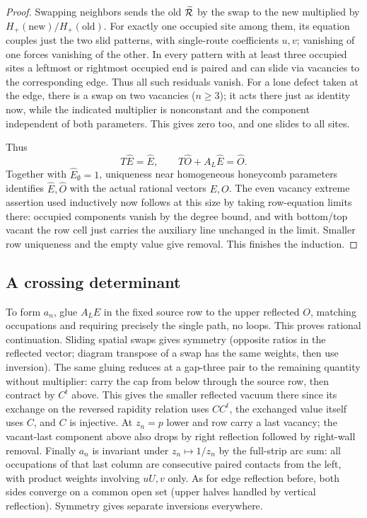 \documentclass[11pt]{article}
\numberwithin{equation}{section}
\theoremstyle{definition}\newtheorem{definition}[theorem]{Definition}
\theoremstyle{remark}\newtheorem{remark}[theorem]{Remark}
\begin{document}
\begin{proof}
Swapping neighbors sends the old \(\widetilde{\cal R}\) by the swap to the new multiplied by \(H_+(\text{new})/H_+(\text{old})\). For exactly one occupied site among them, its equation couples just the two slid patterns, with single-route coefficients \(u,v\); vanishing of one forces vanishing of the other. In every pattern with at least three occupied sites a leftmost or rightmost occupied end is paired and can slide via vacancies to the corresponding edge. Thus all such residuals vanish. For a lone defect taken at the edge, there is a swap on two vacancies (\(n\ge3\)); it acts there just as identity now, while the indicated multiplier is nonconstant and the component independent of both parameters. This gives zero too, and one slides to all sites.

Thus
\[
 T\widehat E=\widehat E,\qquad
 T\widehat O+A_L\widehat E=\widehat O.
\]
Together with $\widehat E_\emptyset=1$, uniqueness near homogeneous
honeycomb parameters identifies $\widehat E,\widehat O$ with the actual
rational vectors $E,O$. The even vacancy extreme assertion used inductively now follows at this size by taking row-equation limits there: occupied components vanish by the degree bound, and with bottom/top vacant the row cell just carries the auxiliary line unchanged in the limit. Smaller row uniqueness and the empty value give removal. This finishes the induction.
\end{proof}


\subsection{A crossing determinant}\label{L:step8}

To form \(a_n\), glue \(A_L E\) in the fixed source row to the upper reflected \(O\), matching occupations and requiring precisely the single path, no loops. This proves rational continuation. Sliding spatial swaps gives symmetry (opposite ratios in the reflected vector; diagram transpose of a swap has the same weights, then use inversion). The same gluing reduces at a gap-three pair to the remaining quantity without multiplier: carry the cap from below through the source row, then contract by \(C^t\) above. This gives the smaller reflected vacuum there since its exchange on the reversed rapidity relation uses \(CC^t\), the exchanged value itself uses \(C\), and \(C\) is injective. At \(z_n=p\) lower and row carry a last vacancy; the vacant-last component above also drops by right reflection followed by right-wall removal. Finally \(a_n\) is invariant under \(z_n\mapsto1/z_n\) by the full-strip arc sum: all occupations of that last column are consecutive paired contacts from the left, with product weights involving \(uU,v\) only. As for edge reflection before, both sides converge on a common open set (upper halves handled by vertical reflection). Symmetry gives separate inversions everywhere.
\end{document}
